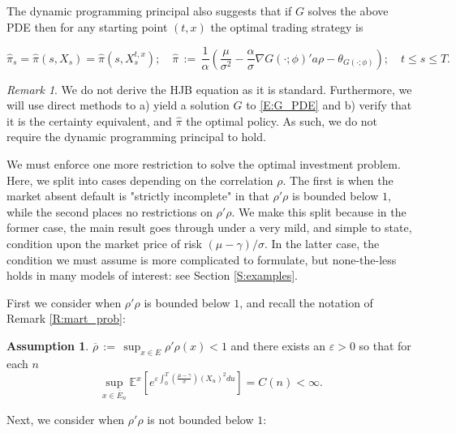 \documentclass[11pt, letterpaper]{amsart}
\theoremstyle{definition}
\newtheorem{assumption}[theorem]{Assumption}
\theoremstyle{remark}
\newtheorem{remark}[theorem]{Remark}
\numberwithin{equation}{section}
\newcommand{\eps}{\varepsilon}
\newcommand{\hpi}{\hat{\pi}}
\newcommand{\esp}{\mathbb{E}}
\newcommand{\espalt}[2]{\esp^{#1}\bra{#2}}
\newcommand{\dfn}{\, := \,}
\newcommand{\bra}[1]{\left[#1\right]}
\newcommand{\ol}[1]{\overline{#1}}
\begin{document}
The dynamic programming principal also suggests that if $G$ solves the above PDE then for any starting point $(t,x)$ the optimal trading strategy is

\begin{equation}\label{E:opt_pi}
\hpi_s = \hpi(s,X_s) = \hpi(s,X^{t,x}_s);\quad \hpi\dfn \frac{1}{\alpha}\left(\frac{\mu}{\sigma^2} - \frac{\alpha}{\sigma}\nabla G(\cdot;\phi)'a\rho - \theta_{G(\cdot;\phi)}\right);\quad t\leq s\leq T.
\end{equation}

\begin{remark}
We do not derive the HJB equation as it is standard.  Furthermore, we will use direct methods to a) yield a solution $G$ to \eqref{E:G_PDE} and b) verify that it is the certainty equivalent, and $\hpi$ the optimal policy.  As such, we do not require the dynamic programming principal to hold.
\end{remark}

We must enforce one more restriction to solve the optimal investment problem.  Here, we split into cases depending on the correlation $\rho$.  The first is when the market absent default is "strictly incomplete" in that $\rho'\rho$ is bounded below $1$, while the second  places no restrictions on $\rho'\rho$.  We make this split because in the former case, the main result goes through under a very mild, and simple to state, condition upon the market price of risk $(\mu-\gamma)/\sigma$.  In the latter case, the condition we must assume is more complicated to formulate, but none-the-less holds in many models of interest: see Section \ref{S:examples}.

First we consider when $\rho'\rho$ is bounded below $1$, and recall the notation of Remark \ref{R:mart_prob}:

\begin{assumption}\label{A:opt_main_ass_inc}
$\ol{\rho}\dfn \sup_{x\in E}\rho'\rho(x) < 1$ and there exists an $\eps>0$ so that for each $n$
\begin{equation*}
\sup_{x\in \ol{E}_n} \espalt{x}{e^{\eps\int_0^T \left(\frac{\mu-\gamma}{\sigma}\right)(X_u)^2 du}} = C(n) < \infty.
\end{equation*}
\end{assumption}

Next, we consider when $\rho'\rho$ is not bounded below $1$:
\end{document}
